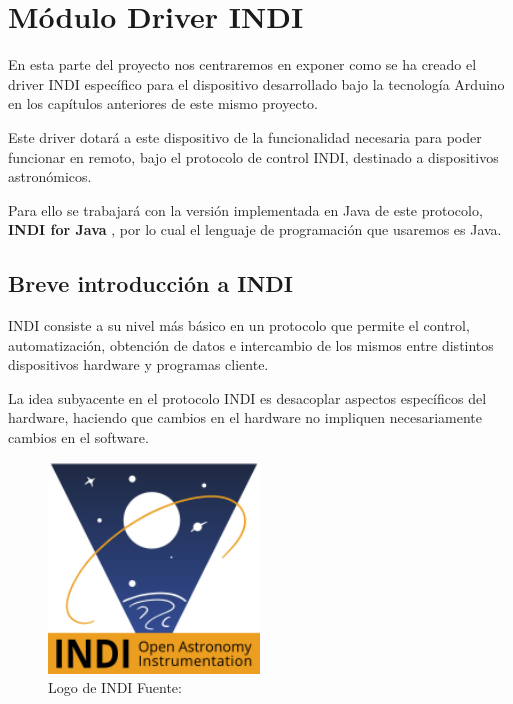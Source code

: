 \chapter{Módulo Driver INDI}


En esta parte del proyecto nos centraremos en exponer como se ha creado el driver INDI específico para el dispositivo desarrollado bajo la tecnología Arduino en los capítulos anteriores de este mismo proyecto.

Este driver dotará a este dispositivo de la funcionalidad necesaria para poder funcionar en remoto, bajo el protocolo de control INDI, destinado a dispositivos astronómicos. 

Para ello se trabajará con la versión implementada en Java de este protocolo, \textbf{INDI for Java} \cite{INDIFJ}, por lo cual el lenguaje de programación que usaremos es Java.


\section{Breve introducción a INDI}

INDI consiste a su nivel más básico en un protocolo que permite el control, automatización, obtención de datos e intercambio de los mismos entre distintos dispositivos hardware y programas cliente. 

La idea subyacente en el protocolo INDI es desacoplar aspectos específicos del hardware, haciendo que cambios en el hardware no impliquen necesariamente cambios en el software.

\begin{figure}[h]
	\begin{center}
		\includegraphics[width=0.5\textwidth]{../images/indi.png}
		\caption[INDI Logo]{Logo de INDI  Fuente: \cite{indi}}
		\label{fig:indi}
	\end{center}
\end{figure}

